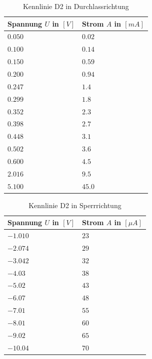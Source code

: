 \documentclass{article}
\theoremstyle{definition}
\begin{document}
    
\begin{table}[h!]
    \centering
    \begin{tabular}{|l|l|}
    \hline
    \textbf{Spannung $U$ in $[V]$} & \textbf{Strom $A$ in $[mA]$} \\
    \hline
    $0.050$ & $0.02$ \\
    $0.100$ & $0.14$ \\
    $0.150$ & $0.59$ \\
    $0.200$ & $0.94$\\
    $0.247$ & $1.4$ \\
    $0.299$ & $1.8$ \\
    $0.352$ & $2.3$ \\
    $0.398$ & $2.7$\\
    $0.448$ & $3.1$ \\
    $0.502$ & $3.6$ \\
    $0.600$ & $4.5$ \\
    $2.016$ & $9.5$ \\
    $5.100$ & $45.0$ \\
    \hline
    \end{tabular}
    \caption{Kennlinie D2 in Durchlassrichtung}
    \label{tab:D2duchlass}
    \end{table}
    
    
    \begin{table}[h!]
    \centering
    \begin{tabular}{|l|l|}
    \hline
    \textbf{Spannung $U$ in $[V]$} & \textbf{Strom $A$ in $[\mu A]$} \\
    \hline
    $-1.010$ & $23$ \\
    $-2.074$ & $29$\\
    $-3.042$ & $32$\\
    $-4.03$ & $38$\\
    $-5.02$ & $43$\\
    $-6.07$ & $48$\\
    $-7.01$ & $55$\\
    $-8.01$ & $60$\\
    $-9.02$ & $65$\\
    $-10.04$ & $70$\\ 
    \hline
    \end{tabular}
    \caption{Kennlinie D2 in Sperrrichtung}
    \label{tab:D2sperr}
    \end{table}
\end{document}
